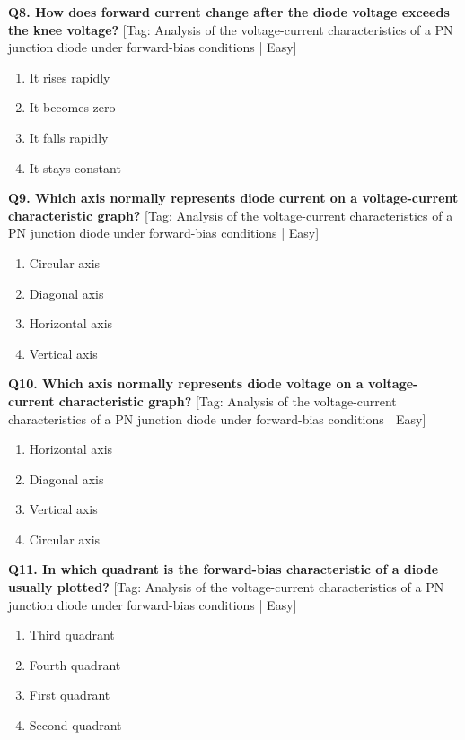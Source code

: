 \noindent\textbf{Q8. How does forward current change after the diode voltage exceeds the knee voltage?} \hfill [Tag: Analysis of the voltage-current characteristics of a PN junction diode under forward-bias conditions | Easy]
\begin{enumerate}[label=(\alph*),topsep=2pt,itemsep=1pt,partopsep=0pt,parsep=0pt]
    \item {It rises rapidly}
    \item {It becomes zero}
    \item {It falls rapidly}
    \item {It stays constant}
\end{enumerate}
\vspace{2mm}

\noindent\textbf{Q9. Which axis normally represents diode current on a voltage-current characteristic graph?} \hfill [Tag: Analysis of the voltage-current characteristics of a PN junction diode under forward-bias conditions | Easy]
\begin{enumerate}[label=(\alph*),topsep=2pt,itemsep=1pt,partopsep=0pt,parsep=0pt]
    \item {Circular axis}
    \item {Diagonal axis}
    \item {Horizontal axis}
    \item {Vertical axis}
\end{enumerate}
\vspace{2mm}

\noindent\textbf{Q10. Which axis normally represents diode voltage on a voltage-current characteristic graph?} \hfill [Tag: Analysis of the voltage-current characteristics of a PN junction diode under forward-bias conditions | Easy]
\begin{enumerate}[label=(\alph*),topsep=2pt,itemsep=1pt,partopsep=0pt,parsep=0pt]
    \item {Horizontal axis}
    \item {Diagonal axis}
    \item {Vertical axis}
    \item {Circular axis}
\end{enumerate}
\vspace{2mm}

\noindent\textbf{Q11. In which quadrant is the forward-bias characteristic of a diode usually plotted?} \hfill [Tag: Analysis of the voltage-current characteristics of a PN junction diode under forward-bias conditions | Easy]
\begin{enumerate}[label=(\alph*),topsep=2pt,itemsep=1pt,partopsep=0pt,parsep=0pt]
    \item {Third quadrant}
    \item {Fourth quadrant}
    \item {First quadrant}
    \item {Second quadrant}
\end{enumerate}
\vspace{2mm}

